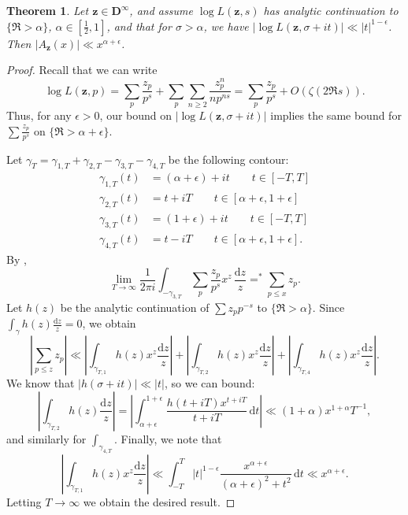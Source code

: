 \documentclass{article}
\newcommand{\bD}{\mathbf{D}}
\newcommand{\bz}{{\boldsymbol z}}
\newcommand{\dd}{\mathrm{d}}
\newtheorem{theorem}[subsection]{Theorem}
\theoremstyle{definition}
\begin{document}
\begin{theorem}
Let $\bz\in \bD^\infty$, and assume $\log L(\bz,s)$ has analytic continuation 
to $\{\Re >\alpha\}$, $\alpha\in [\frac 1 2,1]$, and that for $\sigma>\alpha$, 
we have $|\log L(\bz,\sigma+i t)| \ll |t|^{1-\epsilon}$. Then 
$|A_\bz(x)| \ll x^{\alpha+\epsilon}$. 
\end{theorem}
\begin{proof}
Recall that we can write 
\[
	\log L(\bz,p) = \sum_p \frac{z_p}{p^s} + \sum_p \sum_{n\geqslant 2} \frac{z_p^n}{n p^{n s}} = \sum_p \frac{z_p}{p^s} + O(\zeta(2\Re s)).
\]
Thus, for any $\epsilon>0$, our bound on $|\log L(\bz,\sigma+i t)|$ implies the 
same bound for $\sum \frac{z_p}{p^s}$ on $\{\Re >\alpha+\epsilon\}$. 

Let $\gamma_T=\gamma_{1,T}+\gamma_{2,T}-\gamma_{3,T}-\gamma_{4,T}$ be the 
following contour:
\begin{align*}
	\gamma_{1,T}(t) &= (\alpha+\epsilon)+i t\qquad t\in [-T,T] \\
	\gamma_{2,T}(t) &= t+i T \qquad t\in [\alpha+\epsilon,1+\epsilon] \\
	\gamma_{3,T}(t) &= (1+\epsilon) + i t \qquad t\in [-T,T] \\
	\gamma_{4,T}(t) &= t - i T \qquad t\in [\alpha+\epsilon,1+\epsilon] .
\end{align*}
By \cite[?]{?}, 
\[
	\lim_{T\to \infty} \frac{1}{2\pi i} \int_{-\gamma_{3,T}} \sum_p \frac{z_p}{p^s} x^z\, \frac{\dd z}{z} =^\ast \sum_{p\leqslant x} z_p .
\]
Let $h(z)$ be the analytic continuation of $\sum z_p p^{-s}$ to 
$\{\Re >\alpha\}$. Since $\int_\gamma h(z) \frac{\dd z}{z} = 0$, we obtain
\[
	\left| \sum_{p\leqslant z} z_p\right| \ll \left|\int_{\gamma_{T,1}}h(z)x^z\frac{\dd z}{z}\right| + \left|\int_{\gamma_{T,2}}h(z)x^z\frac{\dd z}{z}\right| + \left|\int_{\gamma_{T,4}}h(z)x^z\frac{\dd z}{z}\right| .
\]
We know that $|h(\sigma+ i t)| \ll |t|$, so we can bound:
\[
	\left|\int_{\gamma_{T,2}}h(z)\frac{\dd z}{z}\right|
		= \left| \int_{\alpha+\epsilon}^{1+\epsilon} \frac{h(t+i T)x^{t+i T}}{t+i T}\, \dd t\right| 
		\ll (1+\alpha)x^{1+\alpha} T^{-1} ,
\]
and similarly for $\int_{\gamma_{4,T}}$. Finally, we note that 
\[
	\left|\int_{\gamma_{T,1}}h(z)x^z\frac{\dd z}{z}\right| \ll \int_{-T}^T |t|^{1-\epsilon} \frac{x^{\alpha+\epsilon}}{(\alpha+\epsilon)^2+t^2}\, \dd t \ll x^{\alpha+\epsilon} .
\]
Letting $T\to \infty$ we obtain the desired result.
\end{proof}
\end{document}
